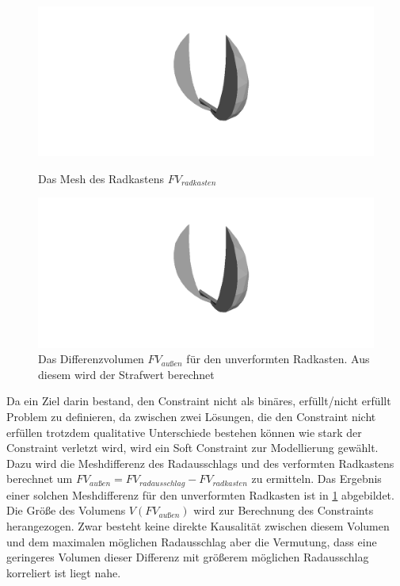 \begin{figure}[h]
	\centering
	\begin{minipage}{0.45\textwidth}
		\centering
		\includegraphics[width=.5\linewidth]{bilder/difference.png}
		\caption{Das Mesh des Radkastens $FV_{radkasten}$}
		\label{fig:wheelcase}
	\end{minipage}\hfill
	\begin{minipage}{0.45\textwidth}
		\centering
		\includegraphics[width=.5\linewidth]{bilder/difference.png}
		\caption{Das Differenzvolumen $FV_{außen}$ für den unverformten Radkasten. Aus diesem wird der Strafwert berechnet}
		\label{fig:diff_volume}
	\end{minipage}
\end{figure}
Da ein Ziel darin bestand, den Constraint nicht als binäres, erfüllt/nicht erfüllt Problem zu definieren, da zwischen zwei Lösungen, die den Constraint nicht erfüllen trotzdem qualitative Unterschiede bestehen können wie stark der Constraint verletzt wird, wird ein Soft Constraint zur Modellierung gewählt.
Dazu wird die Meshdifferenz des Radausschlags und des verformten Radkastens berechnet um $FV_{außen} = FV_{radausschlag} - FV_{radkasten}$ zu ermitteln.
Das Ergebnis einer solchen Meshdifferenz für den unverformten Radkasten ist in \ref{fig:diff_volume} abgebildet.
Die Größe des Volumens $V(FV_{außen})$ wird zur Berechnung des Constraints herangezogen.
Zwar besteht keine direkte Kausalität zwischen diesem Volumen und dem maximalen möglichen Radausschlag aber die Vermutung, dass eine geringeres Volumen dieser Differenz mit größerem möglichen Radausschlag korreliert ist liegt nahe.

